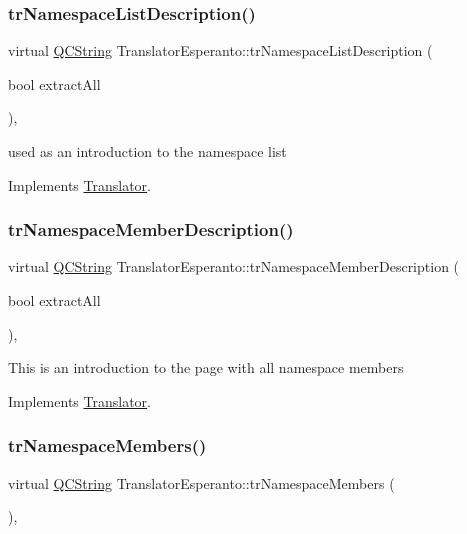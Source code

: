 \subsubsection{\texorpdfstring{trNamespaceListDescription()}{trNamespaceListDescription()}}
{\footnotesize\ttfamily virtual \mbox{\hyperlink{class_q_c_string}{Q\+C\+String}} Translator\+Esperanto\+::tr\+Namespace\+List\+Description (\begin{DoxyParamCaption}\item[{bool}]{extract\+All }\end{DoxyParamCaption})\hspace{0.3cm}{\ttfamily [inline]}, {\ttfamily [virtual]}}

used as an introduction to the namespace list 

Implements \mbox{\hyperlink{class_translator}{Translator}}.

\mbox{\label{class_translator_esperanto_a9aae161ea89e2381e0e8ae6d5cc89cb1}} 
\subsubsection{\texorpdfstring{trNamespaceMemberDescription()}{trNamespaceMemberDescription()}}
{\footnotesize\ttfamily virtual \mbox{\hyperlink{class_q_c_string}{Q\+C\+String}} Translator\+Esperanto\+::tr\+Namespace\+Member\+Description (\begin{DoxyParamCaption}\item[{bool}]{extract\+All }\end{DoxyParamCaption})\hspace{0.3cm}{\ttfamily [inline]}, {\ttfamily [virtual]}}

This is an introduction to the page with all namespace members 

Implements \mbox{\hyperlink{class_translator}{Translator}}.

\mbox{\label{class_translator_esperanto_a9568ffcb795c221e55444fa3e15121a3}} 
\subsubsection{\texorpdfstring{trNamespaceMembers()}{trNamespaceMembers()}}
{\footnotesize\ttfamily virtual \mbox{\hyperlink{class_q_c_string}{Q\+C\+String}} Translator\+Esperanto\+::tr\+Namespace\+Members (\begin{DoxyParamCaption}{ }\end{DoxyParamCaption})\hspace{0.3cm}{\ttfamily [inline]}, {\ttfamily [virtual]}}

